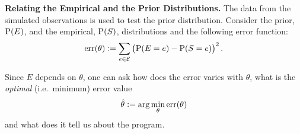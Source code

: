 \documentclass{llncs}
\newcommand{\at}[1]{\ensuremath{\!\del{#1}}}
\newcommand{\fml}[1]{\ensuremath{{\cal #1}}}
\newcommand{\pr}[1]{\ensuremath{\mathrm{P}\at{#1}}}
\newcommand{\err}[1]{\ensuremath{\mathrm{err}\at{#1}}}
\begin{document}
\noindent\textbf{Relating the Empirical and the Prior Distributions.} The data from the simulated observations is used to test the prior distribution. Consider the prior, $\pr{E}$, and the empirical, $\pr{S}$, distributions and the following error function:
\begin{equation}
    \err{\theta} := \sum_{e\in\fml{E}} \del{\pr{E = e} - \pr{S = e}}^2.\label{eq:err.e.s}
\end{equation}

Since $E$ depends on $\theta$, one can ask how does the error varies with $\theta$, what is  the \emph{optimal} (i.e.\ minimum) error value
          \begin{equation}
              \hat{\theta} := \arg\min_\theta \err{\theta}\label{eq:opt.err}
          \end{equation}
          and what does it tell us about the program.
\end{document}
